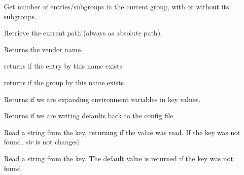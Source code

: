 
Get number of entries/subgroups in the current group, with or without its
subgroups.


\label{wxconfigbasegetpath}


Retrieve the current path (always as absolute path).


\label{wxconfigbasegetvendorname}


Returns the vendor name.


\label{wxconfigbasehasentry}


returns \true if the entry by this name exists


\label{wxconfigbasehasgroup}


returns \true if the group by this name exists


\label{wxconfigbaseisexpandingenvvars}


Returns \true if we are expanding environment variables in key values.


\label{wxconfigbaseisrecordingdefaults}


Returns \true if we are writing defaults back to the config file.


\label{wxconfigbaseread}


Read a string from the key, returning \true if the value was read. If the key
was not found, {\it str} is not changed.


Read a string from the key. The default value is returned if the key was not
found.


